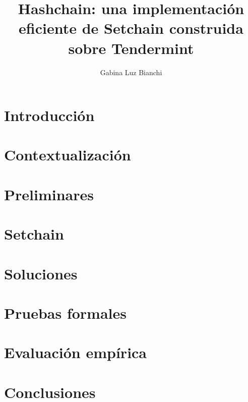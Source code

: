 \documentclass[a4paper, 11pt]{book}
\title{Hashchain: una implementación eficiente de Setchain construida sobre Tendermint}
\author{Gabina Luz Bianchi}
\begin{document}


%

\tableofcontents{}

\chapter{Introducción}


\chapter{Contextualización}


\chapter{Preliminares}


\chapter{Setchain}\label{chapter:setchain}


\chapter{Soluciones}\label{chapter:sol}


\chapter{Pruebas formales}


\chapter{Evaluación empírica}


\chapter{Conclusiones}

\end{document}
